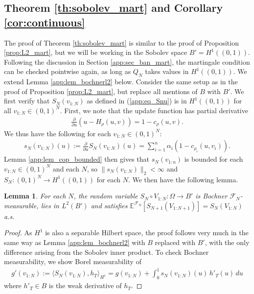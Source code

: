 \documentclass[11pt,a4paper]{article}
\newtheorem{lem}{Lemma}
\newcommand{\E}{\mathbb{E}}
\begin{document}
\begin{appendices}
\subsection{{Theorem \ref{th:sobolev_mart}} and {Corollary \ref{cor:continuous}}}
The proof of {Theorem \ref{th:sobolev_mart}} is similar to the proof of {Proposition \ref{prop:L2_mart}}, but we will be working in the Sobolev space $B' = H^1((0,1))$. Following the discussion
in Section \ref{app:sec_ban_mart}, the martingale condition can be checked pointwise again, as long as $Q_N$ takes values in $H^1((0,1))$. We extend {Lemma \ref{app:lem_bochnerl2}} below.
Consider the same setup as in the proof of {Proposition \ref{prop:L2_mart}}, but replace all mentions of $B$ with $B'$. We first verify that $S_N(v_{1:N})$ as defined in (\ref{app:eq_Snu}) is in $H^1((0,1))$ for all $v_{1:N} \in (0,1)^N$. First, we note that
the update function has partial derivative
\begin{align}\label{app:eq_partial}
    \frac{\partial}{\partial u} (u - H_\rho(u,v)) = 1 - c_\rho(u,v).
\end{align}
We thus have the following for each $v_{1:N} \in (0,1)^N$:
\begin{align*}
  s_N(v_{1:N})(u) := \frac{\partial}{\partial u} S_N(v_{1:N})(u) = \sum_{i = 1}^n \alpha_i (1 - c_{\rho_i}(u,v_i)). 
\end{align*}
{Lemma \ref{app:lem_cop_bounded}} then gives that $s_N(v_{1:n})$ is bounded for each $v_{1:N} \in (0,1)^N$ and each $N$, so $\|s_N(v_{1:N})\|_2 < \infty$ and $S_N: (0,1)^N \to H^1((0,1))$ for each $N$. We then have the following lemma.
\begin{lem}\label{app:lem_bochnerh1}
For each $N$, the random variable $S_N \circ V_{1:N}: \Omega \to B'$ is Bochner $\mathcal{F}_N$-measurable, lies in $L^2(B')$ and satisfies
$\E^{\mathcal{F}_N}[S_{N+1}(V_{1:N+1})] = S_N(V_{1:N})$ a.s.  
\end{lem}
\begin{proof}
    As $H^1$ is also a separable Hilbert space, the proof follows very much in the same way as {Lemma \ref{app:lem_bochnerl2}} with $B$ replaced with $B'$, with the only difference arising from the Sobolev inner product. To check Bochner measurability, we show Borel measurability of
    \begin{align*}
        g'(v_{1:N}):= \langle S_N(v_{1:N}), h_T\rangle_{H^1} =  g(v_{1:N})+  \int_0^1 s_N(v_{1:N})(u) \, h'_T(u) \, du
    \end{align*}
    where $h'_T\in B$ is the weak derivative of $h_T$.

\end{proof}
\end{appendices}
\end{document}
